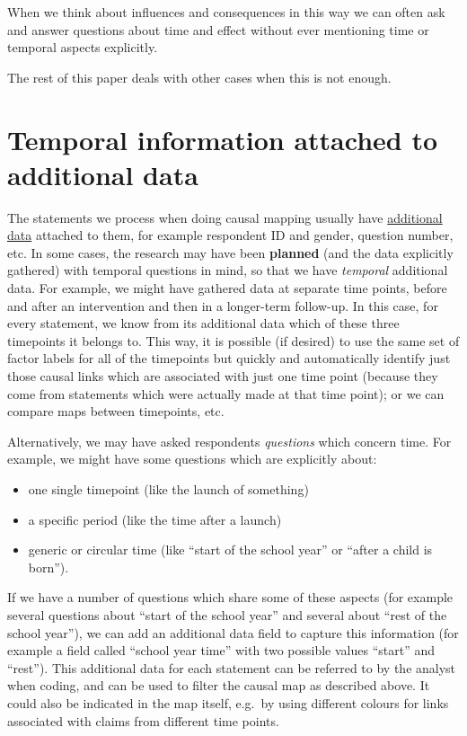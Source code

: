 \documentclass[
]{book}
\begin{document}
When we think about influences and consequences in this way we can often ask and answer questions about time and effect without ever mentioning time or temporal aspects explicitly.

The rest of this paper deals with other cases when this is not enough.

\hypertarget{temporal-information-attached-to-additional-data}{%
\section{Temporal information attached to additional data}\label{temporal-information-attached-to-additional-data}}

The statements we process when doing causal mapping usually have \href{https://causalmapdocumentation.blot.im/search?q=additional+data}{additional data} attached to them, for example respondent ID and gender, question number, etc. In some cases, the research may have been \textbf{planned} (and the data explicitly gathered) with temporal questions in mind, so that we have \emph{temporal} additional data. For example, we might have gathered data at separate time points, before and after an intervention and then in a longer-term follow-up. In this case, for every statement, we know from its additional data which of these three timepoints it belongs to. This way, it is possible (if desired) to use the same set of factor labels for all of the timepoints but quickly and automatically identify just those causal links which are associated with just one time point (because they come from statements which were actually made at that time point); or we can compare maps between timepoints, etc.

Alternatively, we may have asked respondents \emph{questions} which concern time. For example, we might have some questions which are explicitly about:

\begin{itemize}
\item
  one single timepoint (like the launch of something)
\item
  a specific period (like the time after a launch)
\item
  generic or circular time (like ``start of the school year'' or ``after a child is born'').
\end{itemize}

If we have a number of questions which share some of these aspects (for example several questions about ``start of the school year'' and several about ``rest of the school year''), we can add an additional data field to capture this information (for example a field called ``school year time'' with two possible values ``start'' and ``rest''). This additional data for each statement can be referred to by the analyst when coding, and can be used to filter the causal map as described above. It could also be indicated in the map itself, e.g.~by using different colours for links associated with claims from different time points.
\end{document}
